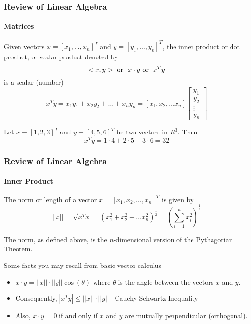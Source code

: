 \begin{frame}
\frametitle{Review of Linear Algebra}
\framesubtitle{Matrices}
\begin{definition}
Given vectors $x=[x_1,\dots,x_n]^T$ and $y=[y_1,\dots,y_n]^T$, the {\bor inner product} or
{\bor dot product}, or {\bor scalar product} denoted by
$$
<x,y> \ \mbox{\rm or }\ x\cdot y \ \mbox{\rm or }\ x^Ty
$$
is a {\bor scalar (number)}
$$
x^Ty = x_1y_1 + x_2y_2 + \dots + x_ny_n = [x_1,x_2,\dots x_n] \left[\begin{array}{c} y_1 \\ y_2\\ \vdots\\ y_n \end{array}\right]
$$
\end{definition}
\begin{examp}
Let $x= [1,2,3]^T$ and $y=[4,5,6]^T$ be two vectors in $R^3$.  Then
$$
x^Ty = 1\cdot 4 + 2\cdot 5 + 3\cdot 6 = 32
$$
\end{examp}
\end{frame}
\begin{frame}
\frametitle{Review of Linear Algebra}
\framesubtitle{Inner Product}
\begin{definition}
The {\bor norm} or {\bor length} of a vector $x = [x_1,x_2,\dots,x_n]^T$ is given by
$$
||x|| = \sqrt{ x^Tx} = (x_1^2 + x_2^2 + \dots x_n^2)^{\frac{1}{2}} = (\sum_{i=1}^n x_i^2)^{\frac{1}{2}}
$$
\end{definition}
The norm, as defined above, is the $n$-dimensional version of the {\bor Pythagorian Theorem}.

Some facts you may recall from basic vector calculus
\begin{itemize}
\item
$x\cdot y = ||x||\cdot ||y||\cos(\theta)$ where $\theta$ is the angle between the vectors $x$ and $y$.
\item
Consequently, $|x^Ty| \le ||x||\cdot ||y||$ \ {\bor Cauchy-Schwartz Inequality}
\item
Also, $x\cdot y = 0$ if and only if $x$ and $y$ are {\bor mutually perpendicular (orthogonal)}.
\end{itemize}
\end{frame}
